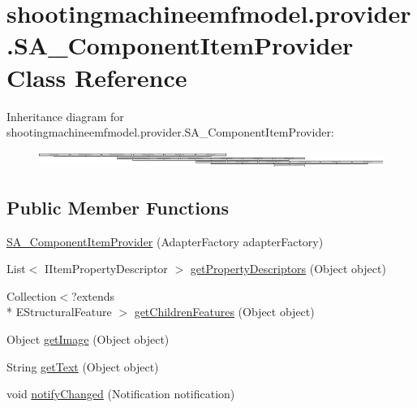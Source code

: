 \hypertarget{classshootingmachineemfmodel_1_1provider_1_1_s_a___component_item_provider}{\section{shootingmachineemfmodel.\-provider.\-S\-A\-\_\-\-Component\-Item\-Provider Class Reference}
\label{classshootingmachineemfmodel_1_1provider_1_1_s_a___component_item_provider}
}
Inheritance diagram for shootingmachineemfmodel.\-provider.\-S\-A\-\_\-\-Component\-Item\-Provider\-:\begin{figure}[H]
\begin{center}
\leavevmode
\includegraphics[height=0.534479cm]{classshootingmachineemfmodel_1_1provider_1_1_s_a___component_item_provider}
\end{center}
\end{figure}
\subsection*{Public Member Functions}
\begin{DoxyCompactItemize}
\item 
\hyperlink{classshootingmachineemfmodel_1_1provider_1_1_s_a___component_item_provider_abb02eaf85f43071062ef6e9febbcc46e}{S\-A\-\_\-\-Component\-Item\-Provider} (Adapter\-Factory adapter\-Factory)
\item 
List$<$ I\-Item\-Property\-Descriptor $>$ \hyperlink{classshootingmachineemfmodel_1_1provider_1_1_s_a___component_item_provider_a7a99459afae49e9ec5e32b9811eb9f9c}{get\-Property\-Descriptors} (Object object)
\item 
Collection$<$?extends \\*
E\-Structural\-Feature $>$ \hyperlink{classshootingmachineemfmodel_1_1provider_1_1_s_a___component_item_provider_aac5bd3f8bb8e0e2f92b40ac22be78725}{get\-Children\-Features} (Object object)
\item 
Object \hyperlink{classshootingmachineemfmodel_1_1provider_1_1_s_a___component_item_provider_a2d617b826110445e6cb51d007ae92aff}{get\-Image} (Object object)
\item 
String \hyperlink{classshootingmachineemfmodel_1_1provider_1_1_s_a___component_item_provider_a9af721a0d893abf9375d07736ffe5fa8}{get\-Text} (Object object)
\item 
void \hyperlink{classshootingmachineemfmodel_1_1provider_1_1_s_a___component_item_provider_a388610c824a232c30d9be152e86bb1f9}{notify\-Changed} (Notification notification)
\end{DoxyCompactItemize}
